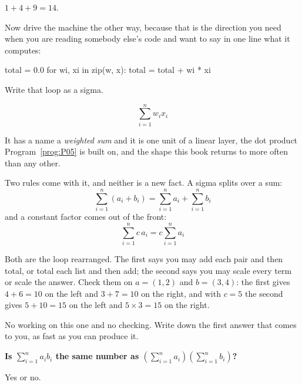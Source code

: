 \begin{fr}
\begin{ansblock}
$1 + 4 + 9 = 14$.
\end{ansblock}

Now drive the machine the other way, because that is the direction you need
when you are reading somebody else's code and want to say in one line what it
computes:

\begin{python}
total = 0.0
for wi, xi in zip(w, x):
    total = total + wi * xi
\end{python}

Write that loop as a sigma.
\nextframe
\end{fr}

\begin{fr}
\begin{ansblock}
\[ \sum_{i=1}^{n} w_i x_i \]
\end{ansblock}

It has a name \dash{} a \emph{weighted sum} \dash{} and it is one unit of a
linear layer, the dot product Program~\ref{prog:P05} is built on, and the
shape this book returns to more often than any other.

Two rules come with it, and neither is a new fact. A sigma splits over a sum:
\[ \sum_{i=1}^{n} (a_i + b_i) = \sum_{i=1}^{n} a_i + \sum_{i=1}^{n} b_i \]
and a constant factor comes out of the front:
\[ \sum_{i=1}^{n} c\,a_i = c \sum_{i=1}^{n} a_i \]

Both are the loop rearranged. The first says you may add each pair and then
total, or total each list and then add; the second says you may scale every
term or scale the answer. Check them on $a = (1, 2)$ and $b = (3, 4)$: the
first gives $4 + 6 = 10$ on the left and $3 + 7 = 10$ on the right, and with
$c = 5$ the second gives $5 + 10 = 15$ on the left and $5 \times 3 = 15$ on
the right.
\end{fr}

\begin{fr}
No working on this one and no checking. Write down the first answer that comes
to you, as fast as you can produce it.

\textbf{Is $\sum_{i=1}^{n} a_i b_i$ the same number as
$\left(\sum_{i=1}^{n} a_i\right)\left(\sum_{i=1}^{n} b_i\right)$?}

Yes or no.
\dotline
\nextframe
\end{fr}


